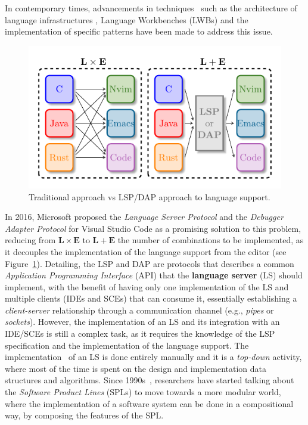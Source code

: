 In contemporary times, advancements in techniques~\cite{Rask21a} such as the architecture of language infrastructures \cite{Lammel18, Voelter13}, Language Workbenches (LWBs) \cite{Erdweg13b} and the implementation of specific patterns \cite{Basten15, Mernik05, Parr09} have been made to address this issue.
\hfill \break
\begin{figure}[t]
    \centering
    \includegraphics[width=0.75\linewidth]{figs/lsp_combinations.pdf}
    \caption{Traditional approach vs LSP/DAP approach to language support.}
    \label{fig:traditional}
\end{figure}
In 2016, Microsoft proposed the \textit{Language Server Protocol} and the \textit{Debugger Adapter Protocol} for Visual Studio Code as a promising solution to this problem, reducing from $\mathbf{L} \times \mathbf{E}$ to $\mathbf{L} + \mathbf{E}$ the number of combinations to be implemented, as it decouples the implementation of the language support from the editor (see Figure~\ref{fig:traditional}).
Detailing, the LSP and DAP are protocols that describes a common \textit{Application Programming Interface} (API) that the \textbf{language server} (LS) should implement, with the benefit of having only one implementation of the LS and multiple clients (IDEs and SCEs) that can consume it, essentially establishing a \textit{client-server} relationship through a communication channel (e.g., \textit{pipes} or \textit{sockets}).
However, the implementation of an LS and its integration with an IDE/SCEs is still a complex task, as it requires the knowledge of the LSP specification and the implementation of the language support.
The implementation~\cite{Gunasinghe22} of an LS is done entirely manually and it is a \textit{top-down} activity, where most of the time is spent on the design and implementation data structures and algorithms.
Since 1990s~\cite{Kang90}, researchers have started talking about the \textit{Software Product Lines} (SPLs) \cite{Cazzola23d, Cazzola20} to move towards a more modular world, where the implementation of a software system can be done in a compositional way, by composing the features of the SPL.
